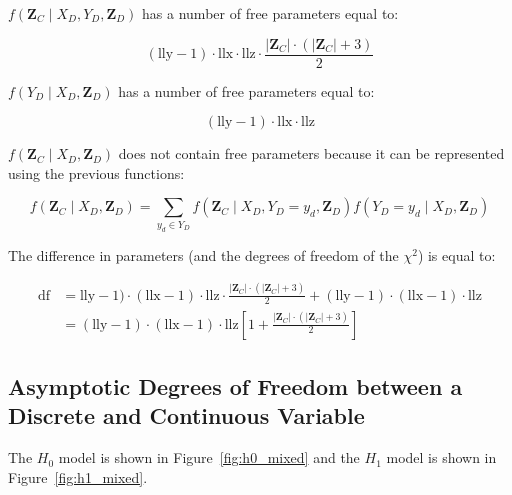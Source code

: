 \documentclass[12pt]{article}
\newcommand{\zd}{\mathbf{Z}_D}
\newcommand{\zc}{\mathbf{Z}_C}
\begin{document}
$f(\zc \mid X_D, Y_D, \zd)$ has  a number of free parameters equal to:

\begin{equation}
(\text{lly} - 1)\cdot\text{llx}\cdot\text{llz}\cdot\frac{\lvert\zc\rvert\cdot(\lvert\zc\rvert + 3)}{2}
\end{equation}


$f(Y_D \mid X_D, \zd)$ has a number of free parameters equal to:

\begin{equation}
(\text{lly} - 1)\cdot\text{llx}\cdot\text{llz}
\end{equation}

$f(\zc \mid X_D, \zd)$ does not contain free parameters because it can be represented using the previous functions:

\begin{equation}
f(\zc \mid X_D, \zd) = \sum\limits_{y_d \in Y_D} f(\zc \mid X_D, Y_D = y_d, \zd) f(Y_D = y_d \mid X_D, \zd)
\end{equation}

The difference in parameters (and the degrees of freedom of the $\chi^2$) is equal to:

\begin{equation}
\begin{aligned}
\text{df} & = \text{lly} - 1)\cdot(\text{llx} - 1)\cdot\text{llz}\cdot\frac{\lvert\zc\rvert\cdot(\lvert\zc\rvert + 3)}{2} + (\text{lly} - 1)\cdot(\text{llx}-1)\cdot\text{llz}\\
& = \boxed{(\text{lly} - 1)\cdot(\text{llx}-1)\cdot\text{llz}\left[1 + \frac{\lvert\zc\rvert\cdot(\lvert\zc\rvert + 3)}{2}\right]}
\end{aligned}
\end{equation}

\subsection{Asymptotic Degrees of Freedom between a Discrete and Continuous Variable}

The $H_{0}$ model is shown in Figure~\ref{fig:h0_mixed} and the $H_{1}$ model is shown in Figure~\ref{fig:h1_mixed}.
\end{document}
